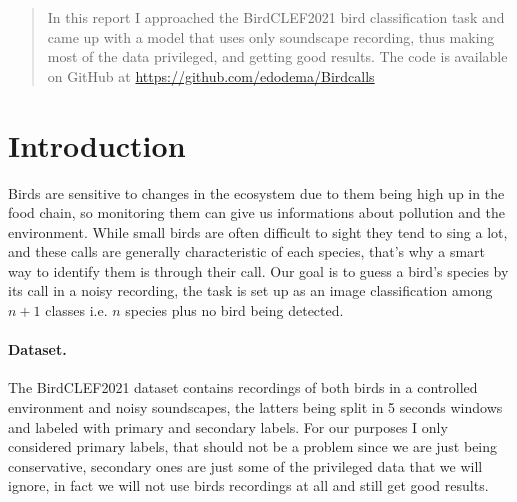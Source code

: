 \documentclass{article}
\begin{document}

\printAffiliationsAndNotice{}

\begin{abstract}
In this report I approached the BirdCLEF2021 bird classification task and came up with a model that uses only soundscape recording, thus making most of the data privileged, and getting good results.
The code is available on GitHub at \href{https://github.com/edodema/Birdcalls}{https://github.com/edodema/Birdcalls}
\end{abstract}

\section{Introduction}
Birds are sensitive to changes in the ecosystem due to them being high up in the food chain, so monitoring them can give us informations about pollution and the environment.
While small birds are often difficult to sight they tend to sing a lot, and these calls are generally characteristic of each species, that's why a smart way to identify them is through their call.
Our goal is to guess a bird's species by its call in a noisy recording, the task is set up as an image classification among $n+1$ classes i.e. $n$ species plus no bird being detected. 

\paragraph*{Dataset.}
The BirdCLEF2021 dataset contains recordings of both birds in a controlled environment and noisy soundscapes,  the  latters  being  split  in  5  seconds  windows  and labeled with primary and secondary labels.
For our purposes I only considered primary labels, that should not be a problem since we are just being conservative, secondary ones are just some of the privileged data that we will ignore, in fact we will not use birds recordings at all and still get good results.
\end{document}
